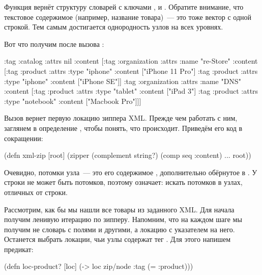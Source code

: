 Функция  вернёт структуру словарей с ключами ,
 и . Обратите внимание, что текстовое содержимое
(например, название товара)~--- это тоже вектор с одной строкой. Тем самым
достигается однородность узлов на всех уровнях.

Вот что получим после вызова :

\begin{english}
  \begin{clojure}
{:tag :catalog
 :attrs nil
 :content
 [{:tag :organization
   :attrs {:name "re-Store"}
   :content
   [{:tag :product
     :attrs {:type "iphone"}
     :content ["iPhone 11 Pro"]}
    {:tag :product
     :attrs {:type "iphone"}
     :content ["iPhone SE"]}]}
  {:tag :organization
   :attrs {:name "DNS"}
   :content
   [{:tag :product
     :attrs {:type "tablet"}
     :content ["iPad 3"]}
    {:tag :product
     :attrs {:type "notebook"}
     :content ["Macbook Pro"]}]}]}
  \end{clojure}
\end{english}

Вызов  вернет первую локацию зиппера
XML. Прежде чем работать с ним, заглянем в определение , чтобы
понять, что происходит. Приведём его код в сокращении:

\begin{english}
  \begin{clojure}
(defn xml-zip
  [root]
  (zipper (complement string?)
          (comp seq :content)
          ...
          root))
  \end{clojure}
\end{english}

Очевидно, потомки узла~--- это его содержимое , дополнительно обёрнутое
в . У строки не может быть потомков, поэтому 
означает: искать потомков в узлах, отличных от строки.

Рассмотрим, как бы мы нашли все товары из заданного XML. Для начала получим
ленивую итерацию по зипперу. Напомним, что на каждом шаге мы получим не словарь
с полями  и другими, а локацию с указателем на него. Останется
выбрать локации, чьи узлы содержат тег . Для этого напишем
предикат:

\begin{english}
  \begin{clojure}
(defn loc-product?
  [loc]
  (-> loc zip/node :tag (= :product)))
  \end{clojure}
\end{english}

